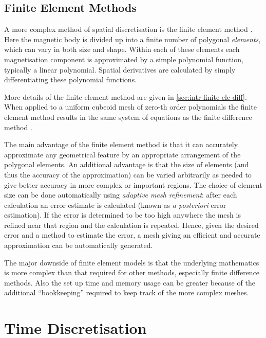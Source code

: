 \subsection{Finite Element Methods}
\label{sec:sd-finite-elem-meth}

A more complex method of spatial discretisation is the finite element method \cite{HowardElmanDavidSilvester2006}.
Here the magnetic body is divided up into a finite number of polygonal \emph{elements}, which can vary in both size and shape.
Within each of these elements each magnetisation component is approximated by a simple polynomial function, typically a linear polynomial.
Spatial derivatives are calculated by simply differentiating these polynomial functions.

More details of the finite element method are given in \autoref{sec:intr-finite-ele-diff}.
When applied to a uniform cubeoid mesh of zero-th order polynomials the finite element method results in the same system of equations as the finite difference method \cite{??ds}.

The main advantage of the finite element method is that it can accurately approximate any geometrical feature by an appropriate arrangement of the polygonal elements.
An additional advantage is that the size of elements (and thus the accuracy of the approximation) can be varied arbitrarily as needed to give better accuracy in more complex or important regions. 
The choice of element size can be done automatically using \emph{adaptive mesh refinement}: after each calculation an error estimate is calculated (known as \emph{a posteriori} error estimation).
If the error is determined to be too high anywhere the mesh is refined near that region and the calculation is repeated.
Hence, given the desired error and a method to estimate the error, a mesh giving an efficient and accurate approximation can be automatically generated.\cite{Schrefl1999}

The major downside of finite element models is that the underlying mathematics is more complex than that required for other methods, especially finite difference methods.
Also the set up time and memory usage can be greater because of the additional ``bookkeeping'' required to keep track of the more complex meshes.


\section{Time Discretisation}
\label{sec:time-discretisation}

